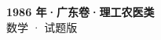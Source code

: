 \documentclass[zihao=-4, a4paper]{ctexart}
\begin{document}
\begin{center}
  {\Large\bfseries 1986 年·广东卷·理工农医类}\\[4pt]
  {\large 数学 · 试题版}
\end{center}
\medskip
{}

\end{document}
